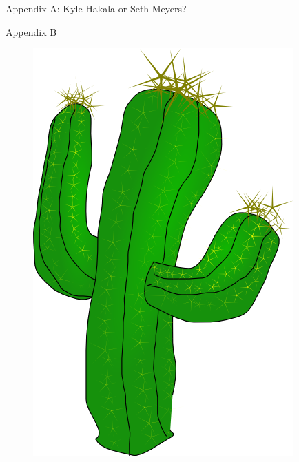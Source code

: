 \documentclass[xcolor=dvipsnames,aspectratio=1610]{beamer}
\begin{document}
\begin{frame}{Appendix A: Kyle Hakala or Seth Meyers?}
  \end{frame}

  \begin{frame}{Appendix B}
      \begin{figure}
        \includegraphics[scale=0.6]{cactus.png}
      \end{figure}
  \end{frame}
\end{document}
